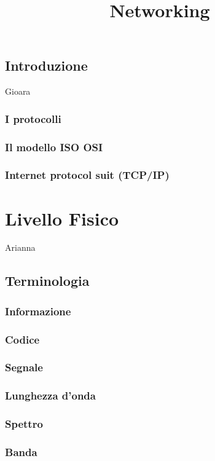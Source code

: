\documentclass[a4paper,11pt]{paper}
\title{Networking}
\begin{document}
\maketitle
\tableofcontents
\newpage

\subsection{Introduzione}
Gioara
\subsubsection{I protocolli}
\subsubsection{Il modello ISO OSI}
\subsubsection{Internet protocol suit (TCP/IP)}

\newpage

\section{Livello Fisico}
Arianna

\subsection{Terminologia}
\subsubsection{Informazione}
\subsubsection{Codice}
\subsubsection{Segnale}
\subsubsection{Lunghezza d'onda}
\subsubsection{Spettro}
\subsubsection{Banda}
\end{document}
